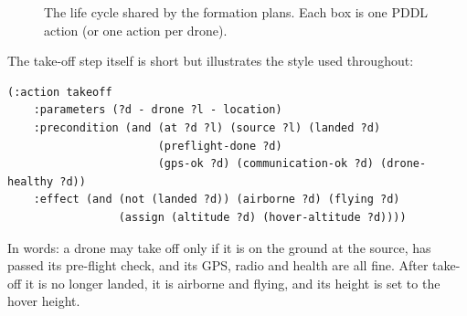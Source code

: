\documentclass[11pt,a4paper,oneside]{report}
\begin{document}
\begin{figure}[H]
\centering
{}
\caption[The life cycle shared by the formation plans]{The life cycle shared by the formation
plans. Each box is one PDDL action (or one action per drone).}
\label{fig:lifecycle}
\end{figure}

The take-off step itself is short but illustrates the style used throughout:

\begin{lstlisting}
(:action takeoff
    :parameters (?d - drone ?l - location)
    :precondition (and (at ?d ?l) (source ?l) (landed ?d)
                       (preflight-done ?d)
                       (gps-ok ?d) (communication-ok ?d) (drone-healthy ?d))
    :effect (and (not (landed ?d)) (airborne ?d) (flying ?d)
                 (assign (altitude ?d) (hover-altitude ?d))))
\end{lstlisting}

\noindent In words: a drone may take off only if it is on the ground at the source, has passed
its pre-flight check, and its GPS, radio and health are all fine. After take-off it is no longer
landed, it is airborne and flying, and its height is set to the hover height.
\end{document}
